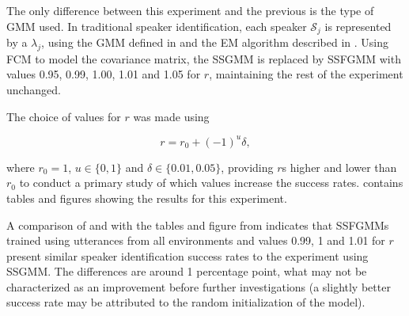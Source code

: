 The only difference between this experiment and the previous is the type of GMM used. In traditional speaker identification, each speaker $\mathcal{S}_j$ is represented by a $\lambda_j$, using the GMM defined in  and the EM algorithm described in . Using FCM to model the covariance matrix, the SSGMM is replaced by SSFGMM with values 0.95, 0.99, 1.00, 1.01 and 1.05 for $r$, maintaining the rest of the experiment unchanged.

The choice of values for $r$ was made using

\begin{equation}
    r = r_0 + (-1)^u\delta,
    \label{eq:choice-of-r}
\end{equation}

\noindent where $r_0 = 1$, $u \in \{0, 1\}$ and $\delta \in \{0.01, 0.05\}$, providing $r$s higher and lower than $r_0$ to conduct a primary study of which values increase the success rates.  contains tables and figures showing the results for this experiment.

A comparison of  and  with the tables and figure from  indicates that SSFGMMs trained using utterances from all environments and values 0.99, 1 and 1.01 for $r$ present similar speaker identification success rates to the experiment using SSGMM. The differences are around 1 percentage point, what may not be characterized as an improvement before further investigations (a slightly better success rate may be attributed to the random initialization of the model).






